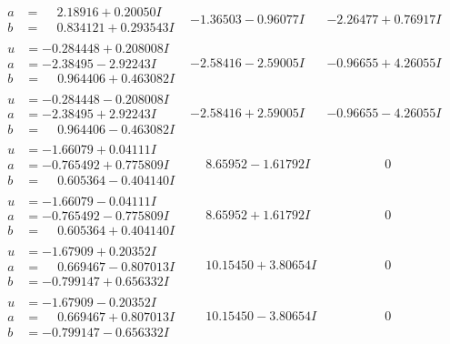 \documentclass[1p]{elsarticle_modified}
\theoremstyle{definition}
\begin{document}
$$\begin{array}{c|c|c}
\begin{aligned}
a &= \phantom{-}2.18916 + 0.20050 I \\
b &= \phantom{-}0.834121 + 0.293543 I\end{aligned}
 & -1.36503 - 0.96077 I & -2.26477 + 0.76917 I \\ \hline\begin{aligned}
u &= -0.284448 + 0.208008 I \\
a &= -2.38495 - 2.92243 I \\
b &= \phantom{-}0.964406 + 0.463082 I\end{aligned}
 & -2.58416 - 2.59005 I & -0.96655 + 4.26055 I \\ \hline\begin{aligned}
u &= -0.284448 - 0.208008 I \\
a &= -2.38495 + 2.92243 I \\
b &= \phantom{-}0.964406 - 0.463082 I\end{aligned}
 & -2.58416 + 2.59005 I & -0.96655 - 4.26055 I \\ \hline\begin{aligned}
u &= -1.66079 + 0.04111 I \\
a &= -0.765492 + 0.775809 I \\
b &= \phantom{-}0.605364 - 0.404140 I\end{aligned}
 & \phantom{-}8.65952 - 1.61792 I & \phantom{-0.000000 } 0 \\ \hline\begin{aligned}
u &= -1.66079 - 0.04111 I \\
a &= -0.765492 - 0.775809 I \\
b &= \phantom{-}0.605364 + 0.404140 I\end{aligned}
 & \phantom{-}8.65952 + 1.61792 I & \phantom{-0.000000 } 0 \\ \hline\begin{aligned}
u &= -1.67909 + 0.20352 I \\
a &= \phantom{-}0.669467 - 0.807013 I \\
b &= -0.799147 + 0.656332 I\end{aligned}
 & \phantom{-}10.15450 + 3.80654 I & \phantom{-0.000000 } 0 \\ \hline\begin{aligned}
u &= -1.67909 - 0.20352 I \\
a &= \phantom{-}0.669467 + 0.807013 I \\
b &= -0.799147 - 0.656332 I\end{aligned}
 & \phantom{-}10.15450 - 3.80654 I & \phantom{-0.000000 } 0 \\ \hline\begin{aligned}

\end{aligned}
\end{array}$$
\end{document}
